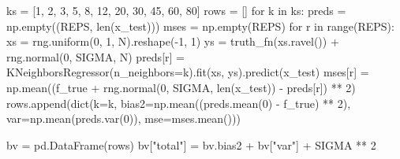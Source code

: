 \documentclass[
  letterpaper,
  10pt,
  twoside,
  openright,
  numbers=noenddot,
  chapterprefix=true]{scrbook}
\newenvironment{Shaded}{}{}
\newcommand{\BuiltInTok}[1]{\textcolor[rgb]{0.84,0.23,0.29}{#1}}
\newcommand{\ControlFlowTok}[1]{\textcolor[rgb]{0.84,0.23,0.29}{#1}}
\newcommand{\DecValTok}[1]{\textcolor[rgb]{0.00,0.36,0.77}{#1}}
\newcommand{\KeywordTok}[1]{\textcolor[rgb]{0.84,0.23,0.29}{#1}}
\newcommand{\NormalTok}[1]{\textcolor[rgb]{0.14,0.16,0.18}{#1}}
\newcommand{\OperatorTok}[1]{\textcolor[rgb]{0.14,0.16,0.18}{#1}}
\newcommand{\StringTok}[1]{\textcolor[rgb]{0.01,0.18,0.38}{#1}}
\begin{document}
\begin{Shaded}
\begin{Highlighting}[]
\NormalTok{ks }\OperatorTok{=}\NormalTok{ [}\DecValTok{1}\NormalTok{, }\DecValTok{2}\NormalTok{, }\DecValTok{3}\NormalTok{, }\DecValTok{5}\NormalTok{, }\DecValTok{8}\NormalTok{, }\DecValTok{12}\NormalTok{, }\DecValTok{20}\NormalTok{, }\DecValTok{30}\NormalTok{, }\DecValTok{45}\NormalTok{, }\DecValTok{60}\NormalTok{, }\DecValTok{80}\NormalTok{]}
\NormalTok{rows }\OperatorTok{=}\NormalTok{ []}
\ControlFlowTok{for}\NormalTok{ k }\KeywordTok{in}\NormalTok{ ks:}
\NormalTok{    preds }\OperatorTok{=}\NormalTok{ np.empty((REPS, }\BuiltInTok{len}\NormalTok{(x\_test)))}
\NormalTok{    mses }\OperatorTok{=}\NormalTok{ np.empty(REPS)}
    \ControlFlowTok{for}\NormalTok{ r }\KeywordTok{in} \BuiltInTok{range}\NormalTok{(REPS):}
\NormalTok{        xs }\OperatorTok{=}\NormalTok{ rng.uniform(}\DecValTok{0}\NormalTok{, }\DecValTok{1}\NormalTok{, N).reshape(}\OperatorTok{{-}}\DecValTok{1}\NormalTok{, }\DecValTok{1}\NormalTok{)}
\NormalTok{        ys }\OperatorTok{=}\NormalTok{ truth\_fn(xs.ravel()) }\OperatorTok{+}\NormalTok{ rng.normal(}\DecValTok{0}\NormalTok{, SIGMA, N)}
\NormalTok{        preds[r] }\OperatorTok{=}\NormalTok{ KNeighborsRegressor(n\_neighbors}\OperatorTok{=}\NormalTok{k).fit(xs, ys).predict(x\_test)}
\NormalTok{        mses[r] }\OperatorTok{=}\NormalTok{ np.mean((f\_true }\OperatorTok{+}\NormalTok{ rng.normal(}\DecValTok{0}\NormalTok{, SIGMA, }\BuiltInTok{len}\NormalTok{(x\_test)) }\OperatorTok{{-}}\NormalTok{ preds[r]) }\OperatorTok{**} \DecValTok{2}\NormalTok{)}
\NormalTok{    rows.append(}\BuiltInTok{dict}\NormalTok{(k}\OperatorTok{=}\NormalTok{k,}
\NormalTok{                     bias2}\OperatorTok{=}\NormalTok{np.mean((preds.mean(}\DecValTok{0}\NormalTok{) }\OperatorTok{{-}}\NormalTok{ f\_true) }\OperatorTok{**} \DecValTok{2}\NormalTok{),}
\NormalTok{                     var}\OperatorTok{=}\NormalTok{np.mean(preds.var(}\DecValTok{0}\NormalTok{)),}
\NormalTok{                     mse}\OperatorTok{=}\NormalTok{mses.mean()))}

\NormalTok{bv }\OperatorTok{=}\NormalTok{ pd.DataFrame(rows)}
\NormalTok{bv[}\StringTok{"total"}\NormalTok{] }\OperatorTok{=}\NormalTok{ bv.bias2 }\OperatorTok{+}\NormalTok{ bv[}\StringTok{"var"}\NormalTok{] }\OperatorTok{+}\NormalTok{ SIGMA }\OperatorTok{**} \DecValTok{2}


\end{Highlighting}
\end{Shaded}
\end{document}
